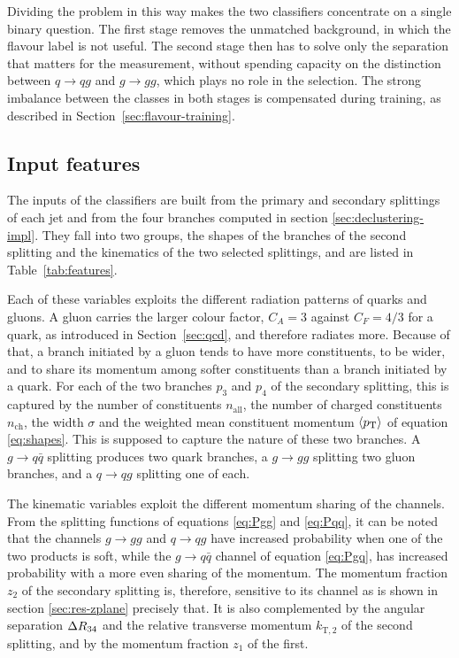 Dividing the problem in this way makes the two classifiers concentrate on a single binary question.
The first stage removes the unmatched background, in which the
flavour label is not useful.  The second stage then has to solve only the
separation that matters for the measurement, without spending capacity on the
distinction between $q \to qg$ and $g \to gg$, which plays no role in the
selection. The strong imbalance between the classes in both stages is compensated
during training, as described in Section~\ref{sec:flavour-training}.

\subsection{Input features}
\label{sec:flavour-features}

The inputs of the classifiers are built from the primary and secondary splittings of each jet and
from the four branches computed in section \ref{sec:declustering-impl}. They fall
into two groups, the shapes of the branches of the second splitting and the
kinematics of the two selected splittings, and are listed in
Table~\ref{tab:features}.

Each of these variables exploits the different radiation patterns of quarks and gluons.
A gluon carries the larger colour factor, $C_A = 3$ against $C_F = 4/3$ for a
quark, as introduced in Section~\ref{sec:qcd}, and therefore radiates more. Because
of that, a branch initiated by a gluon tends to have more constituents, to be wider, and 
to share its momentum among softer constituents than a branch initiated by a
quark. For each of the two branches $p_3$ and $p_4$ of the secondary splitting, this
is captured by the number of constituents $n_{\text{all}}$, the number of charged
constituents $n_{\text{ch}}$, the width $\sigma$ and the weighted mean constituent
momentum $\langle p_{\mathrm{T}} \rangle$ of equation \eqref{eq:shapes}. This is supposed 
to capture the nature of these two branches. A $g \to q\bar{q}$ splitting
produces two quark branches, a $g \to gg$ splitting two gluon branches, and a
$q \to qg$ splitting one of each.

The kinematic variables exploit the different momentum sharing of the channels. From the splitting
functions of equations \eqref{eq:Pgg} and \eqref{eq:Pqq}, it can be noted that the channels
$g \to gg$ and $q \to qg$ have increased probability when one of the two products is soft, while
the $g \to q\bar{q}$ channel of equation \eqref{eq:Pgq}, has increased probability with a more even
sharing of the momentum. The momentum fraction $z_2$ of the secondary splitting is, therefore,
sensitive to its channel as is shown in section \ref{sec:res-zplane} precisely that. 
It is also complemented by the angular separation
$\Delta R_{34}$ and the relative transverse momentum $k_{\mathrm{T},2}$ of the second
splitting, and by the momentum fraction $z_1$ of the first. 

